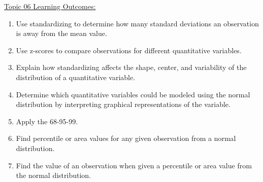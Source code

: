 \documentclass[12pt,english,nohyper]{tufte-handout}\usepackage[]{graphicx}\usepackage[]{color}
\begin{document}
\noindent
\underline{Topic 06 Learning Outcomes:}
\vspace{2mm}

\begin{fullwidth}
\begin{enumerate}[label=\Alph*.,itemsep=-\parsep,leftmargin=*]
  \item
Use standardizing to determine how many standard deviations an observation is away from the mean value.
\item Use z-scores to compare observations for different quantitative variables.
\item Explain how standardizing affects the shape, center, and variability of the distribution of a quantitative variable.
\item Determine which quantitative variables could be modeled using the normal distribution by interpreting graphical representations of the variable.
\item Apply the 68-95-99.
\item Find percentile or area values for any given observation from a normal distribution.
\item Find the value of an observation when given a percentile or area value from the normal distribution.

\end{enumerate}
\end{fullwidth}



\vspace{5mm}
\end{document}
